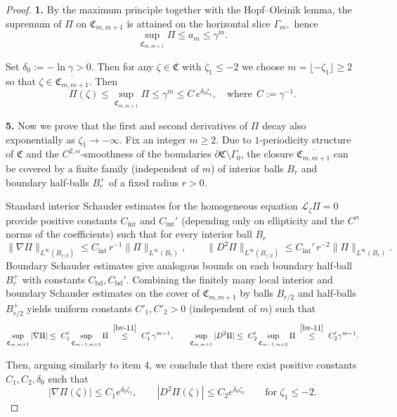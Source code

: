 \documentclass[reqno]{amsart}            %
\numberwithin{equation}{section}
\begin{document}
\begin{proof}{\bf 1.}
		By the maximum principle together with the Hopf–Oleinik lemma, the supremum of $\Pi$ on $\mathfrak{C}_{m, m+1}$ is attained on the horizontal slice $\Gamma_{m},$ hence
		\begin{equation}\label{bv-11}
			\sup_{\mathfrak{C}_{m, m+1}} \Pi \le a_m \le \gamma^m.	
		\end{equation}
		
		Set $\delta_0 :=-\ln\gamma>0.$ Then for any $\zeta \in \overline{\mathfrak{C}}$ with $\zeta_1\le - 2$ we choose $m=\lfloor -\zeta_1\rfloor\ge 2$ so that $\zeta\in \overline{\mathfrak{C}_{m, m+1}}$. Then
		\[
		\Pi(\zeta)\le \sup_{\mathfrak{C}_{m, m+1}}\Pi \le \gamma^m \le C \,  e^{\delta_0 \zeta_1}, \quad \text{where} \ \ C :=\gamma^{-1} .
		\]
		
		
		\smallskip
		\noindent\textbf{5.} Now we prove that the first and second derivatives of $\Pi$
		decay also exponentially as $\zeta_1\to-\infty$. Fix an integer $m\ge2.$ Due to $1$-periodicity structure of $\mathfrak{C}$ and  the $C^{2,\alpha}$-smoothness of the boundaries $\partial\mathfrak{C}\setminus \Gamma_0$,  the closure $\overline{\mathfrak{C}_{m, m+1}}$
		can be covered by a finite family (independent of $m$) of interior balls $B_r$ and boundary half‑balls $B_r^+$
		of a fixed radius $r>0$. 
		
		Standard interior Schauder estimates for the homogeneous equation
		$\mathcal L_\zeta\Pi=0$ provide positive constants $C_{\mathrm{int}}$ and $C_{\mathrm{int}}'$ (depending only
		on ellipticity and the $C^\alpha$ norms of the coefficients) such that for every interior ball $B_r$
		\[
		\|\nabla\Pi\|_{L^\infty(B_{r/2})} \le C_{\mathrm{int}}\,r^{-1}\|\Pi\|_{L^\infty(B_r)},
		\qquad
		\|D^2\Pi\|_{L^\infty(B_{r/2})} \le C_{\mathrm{int}}'\,r^{-2}\|\Pi\|_{L^\infty(B_r)}.
		\]
		Boundary Schauder estimates  give analogous bounds
		on each boundary half‑ball $B_r^+$ with constants $C_{\mathrm{bd}},C_{\mathrm{bd}}'$.
		Combining the finitely many local interior and boundary Schauder estimates on the cover of
		\(\mathfrak C_{m,m+1}\) by balls \(B_{r/2}\) and half‑balls \(B_{r/2}^+\) yields uniform constants  $C'_1,C'_2>0$ (independent of $m$) such that
		\[
		\sup_{\mathfrak{C}_{m, m+1}}|\nabla\Pi| \le \ C'_1 \sup_{\mathfrak{C}_{m-1, m+2}}\Pi \ \stackrel{\eqref{bv-11}}{\le}  \ C'_1\, \gamma^{m-1} ,
		\qquad
		\sup_{\mathfrak{C}_{m, m+1}}|D^2\Pi| \le \ C'_2 \sup_{\mathfrak{C}_{m-1, m+2}}\Pi \ \stackrel{\eqref{bv-11}}{\le}  \ C'_2 \gamma^{m-1}.
		\]
		
		Then, arguing similarly to item 4, we conclude that there exist positive constants
		$C_1,C_2,\delta_0$ such that
		\[
		|\nabla\Pi(\zeta)| \le C_1 e^{\delta_0 \zeta_1},\qquad
		|D^2\Pi(\zeta)| \le C_2 e^{\delta_0 \zeta_1} \qquad\text{for }\zeta_1\le -2.
		\]
	\end{proof}
	
\end{document}
